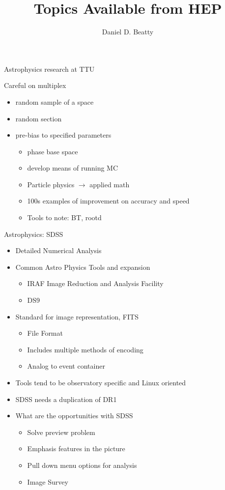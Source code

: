 \documentclass[11pt]{article}
\title{Topics Available from HEP}
\author{Daniel D. Beatty}
\begin{document}
\maketitle

Astrophysics research at TTU

Careful on multiplex
\begin{itemize}
\item random sample of a space 
\item random section
\item pre-bias to specified parameters
\begin{itemize}
\item phase base space
\item develop means of running MC
\item Particle physics $\to$ applied math
\item 100s examples of improvement on accuracy and speed
\item Tools to note: BT, rootd
\end{itemize}

\end{itemize}


Astrophysics: SDSS
\begin{itemize}
\item Detailed Numerical Analysis 
\item Common Astro Physics Tools and expansion
\begin{itemize}
\item IRAF Image Reduction and Analysis Facility
\item DS9 
\end{itemize}
\item Standard for image representation, FITS
\begin{itemize}
\item File Format
\item Includes multiple methods of encoding
\item Analog to event container
\end{itemize}
\item Tools tend to be observatory specific and Linux oriented
\item SDSS needs a duplication of DR1
\item What are the opportunities with SDSS
\begin{itemize}
\item Solve preview problem 
\item Emphasis features in the picture
\item Pull down menu options for analysis
\item Image Survey 
\end{itemize}

\end{itemize}
\end{document}
